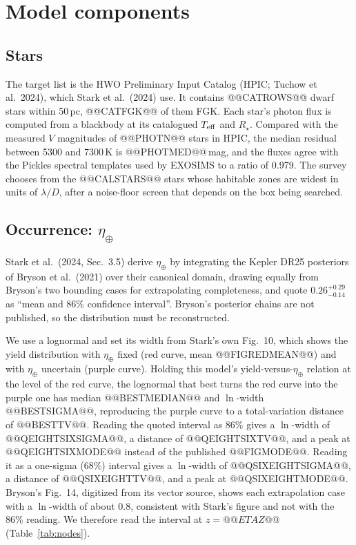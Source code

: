 \documentclass[11pt,a4paper]{article}
\begin{document}
\section{Model components}
\label{sec:nodes}

\subsection{Stars}

The target list is the HWO Preliminary Input Catalog (HPIC; Tuchow et al.\ 2024), which Stark et
al.\ (2024) use. It contains @@CATROWS@@ dwarf stars within 50\,pc, @@CATFGK@@ of them FGK. Each
star's photon flux is computed from a blackbody at its catalogued $T_{\rm eff}$ and $R_\star$.
Compared with the measured $V$ magnitudes of @@PHOTN@@ stars in HPIC, the median residual between
5300 and 7300\,K is @@PHOTMED@@\,mag, and the fluxes agree with the Pickles spectral templates used
by EXOSIMS to a ratio of 0.979. The survey chooses from the @@CALSTARS@@ stars whose habitable
zones are widest in units of $\lambda/D$, after a noise-floor screen that depends on the box being
searched.

\subsection{Occurrence: $\eta_\oplus$}
\label{sec:eta}

Stark et al.\ (2024, Sec.~3.5) derive $\eta_\oplus$ by integrating the Kepler DR25 posteriors of
Bryson et al.\ (2021) over their canonical domain, drawing equally from Bryson's two bounding cases
for extrapolating completeness, and quote $0.26^{+0.29}_{-0.14}$ as ``mean and 86\% confidence
interval''. Bryson's posterior chains are not published, so the distribution must be
reconstructed.

We use a lognormal and set its width from Stark's own Fig.~10, which shows the yield distribution
with $\eta_\oplus$ fixed (red curve, mean @@FIGREDMEAN@@) and with $\eta_\oplus$ uncertain (purple
curve). Holding this model's yield-versus-$\eta_\oplus$ relation at the level of the red curve,
the lognormal that best turns the red curve into the purple one has median @@BESTMEDIAN@@ and
$\ln$-width @@BESTSIGMA@@, reproducing the purple curve to a total-variation distance of
@@BESTTV@@. Reading the quoted interval as 86\% gives a $\ln$-width of @@QEIGHTSIXSIGMA@@, a
distance of @@QEIGHTSIXTV@@, and a peak at @@QEIGHTSIXMODE@@ instead of the published @@FIGMODE@@.
Reading it as a one-sigma (68\%) interval gives a $\ln$-width of @@QSIXEIGHTSIGMA@@, a distance of
@@QSIXEIGHTTV@@, and a peak at @@QSIXEIGHTMODE@@. Bryson's Fig.~14, digitized from its vector
source, shows each extrapolation case with a $\ln$-width of about 0.8, consistent with Stark's
figure and not with the 86\% reading. We therefore read the interval at $z = @@ETAZ@@$
(Table~\ref{tab:nodes}).
\end{document}
